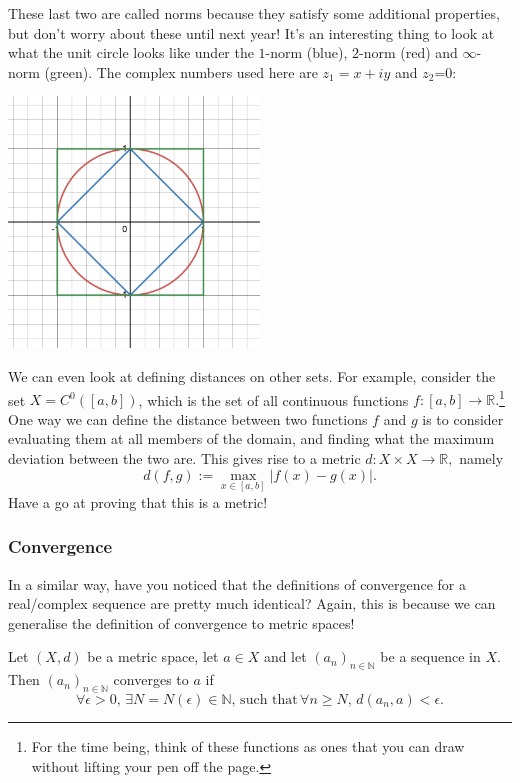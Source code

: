 \documentclass[
  17pt,
  a4paper]{extarticle}
\theoremstyle{plain}
\theoremstyle{definition}
\theoremstyle{plain}
\theoremstyle{plain}
\theoremstyle{plain}
\theoremstyle{plain}
\theoremstyle{definition}
\theoremstyle{definition}
\theoremstyle{remark}
\theoremstyle{remark}
\let\BeginKnitrBlock\begin \let\EndKnitrBlock\end
\renewcommand{\;}{\,}
\begin{document}
These last two are called norms because they satisfy some additional properties, but don't worry about these until next year! It's an interesting thing to look at what the unit circle looks like under the \(1\)-norm (blue), \(2\)-norm (red) and \(\infty\)-norm (green). The complex numbers used here are \(z_1 = x + iy\) and \(z_2\)=0:

\includegraphics[width=0.5\textwidth,height=\textheight]{unitcircle.png}

We can even look at defining distances on other sets. For example, consider the set \(X = C^{0}([a,b])\), which is the set of all continuous functions \(f:[a,b] \to \mathbb{R}.\)\footnote{For the time being, think of these functions as ones that you can draw without lifting your pen off the page.} One way we can define the distance between two functions \(f\) and \(g\) is to consider evaluating them at all members of the domain, and finding what the maximum deviation between the two are. This gives rise to a metric \(d:X\times X \to \mathbb{R},\) namely \[d(f,g) := \max_{x \in [a,b]} \lvert f(x) - g(x) \rvert.\] Have a go at proving that this is a metric!

\hypertarget{convergence}{%
\subsubsection{Convergence}\label{convergence}}

In a similar way, have you noticed that the definitions of convergence for a real/complex sequence are pretty much identical? Again, this is because we can generalise the definition of convergence to metric spaces!

\BeginKnitrBlock{definition}[Convergence]
{\label{def:def4} }Let \((X,d)\) be a metric space, let \(a \in X\) and let \((a_n)_{n\in\mathbb{N}}\) be a sequence in \(X\). Then \((a_n)_{n\in\mathbb{N}}\) converges to \(a\) if \[\forall \epsilon > 0, \; \exists N = N(\epsilon) \in \mathbb{N}, \; \text{such that} \; \forall n \geq N, \; d(a_n,a) < \epsilon.\]
\EndKnitrBlock{definition}
\end{document}
